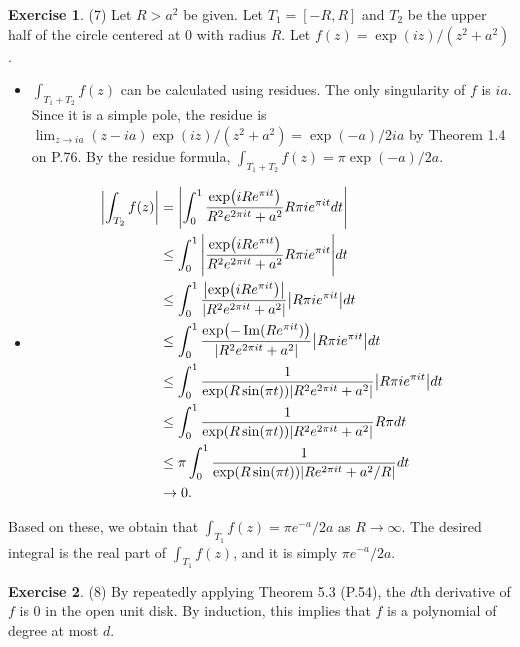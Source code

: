 \documentclass[12pt, psamsfonts]{amsart}
\theoremstyle{definition}
\newtheorem*{exer}{Exercise}
\theoremstyle{remark}
\numberwithin{equation}{section}
\begin{document}
\begin{exer}{(7)}
  Let $R > a^2$ be given.
  Let $T_1 = [-R, R]$ and $T_2$ be the upper half of the circle centered at 0 with radius $R$.
  Let $f(z) = \exp(iz) / (z^2 + a^2)$.

  \begin{itemize}
    \item
      $\int_{T_1 + T_2} f(z)$ can be calculated using residues.
      The only singularity of $f$ is $ia$.
      Since it is a simple pole, the residue is $\lim_{z \rightarrow ia} (z - ia)\exp(iz) / (z^2 + a^2) = \exp(-a) / 2ia$ by Theorem 1.4 on P.76.
      By the residue formula, $\int_{T_1 + T_2} f(z) = \pi\exp(-a) / 2a$.
    \item
      \begin{align*}
        \abs{\int_{T_2} f(z)}
          &= \abs{\int_{0}^{1} \frac{\exp(iRe^{\pi i t})}{R^2e^{2\pi it} + a^2} R\pi i e^{\pi i t} dt} \\
          &\leq \int_{0}^{1} \abs{\frac{\exp(iRe^{\pi i t})}{R^2e^{2\pi it} + a^2} R\pi i e^{\pi i t}} dt \\
          &\leq \int_{0}^{1} \frac{\abs{\exp(iRe^{\pi i t})}}{\abs{R^2e^{2\pi it} + a^2}} \abs{R\pi i e^{\pi i t}} dt \\
          &\leq \int_{0}^{1} \frac{\exp(-\Im(R e^{\pi i t}))}{\abs{R^2e^{2\pi it} + a^2}} \abs{R\pi i e^{\pi i t}} dt \\
          &\leq \int_{0}^{1} \frac{1}{\exp(R\sin(\pi t))\abs{R^2e^{2\pi it} + a^2}} \abs{R\pi i e^{\pi i t}} dt \\
          &\leq \int_{0}^{1} \frac{1}{\exp(R\sin(\pi t))\abs{R^2e^{2\pi it} + a^2}} R\pi dt \\
          &\leq \pi \int_{0}^{1} \frac{1}{\exp(R\sin(\pi t))\abs{Re^{2\pi it} + a^2 / R}} dt \\
          &\rightarrow 0. %
      \end{align*}
  \end{itemize}
  Based on these, we obtain that $\int_{T_1} f(z) = \pi e^{-a} / 2a$ as $R \rightarrow \infty$.
  The desired integral is the real part of $\int_{T_1} f(z)$, and it is simply $\pi e^{-a} / 2a$.
\end{exer}

\begin{exer}{(8)}
  By repeatedly applying Theorem 5.3 (P.54), the $d$th derivative of $f$ is 0 in the open unit disk.
  By induction, this implies that $f$ is a polynomial of degree at most $d$.
\end{exer}
\end{document}

